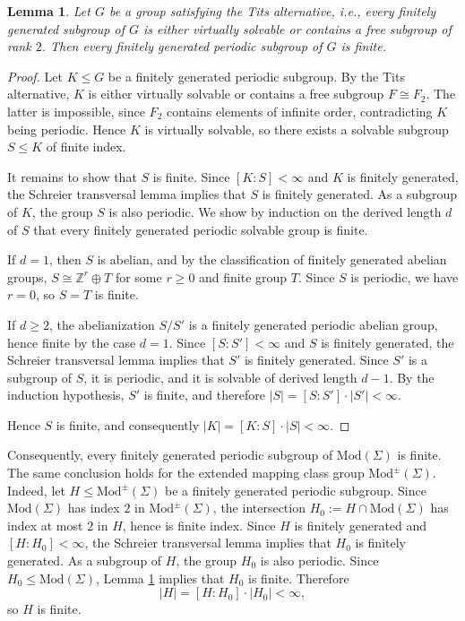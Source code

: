 \documentclass[12pt,a4paper]{amsart}
\numberwithin{equation}{section}
\theoremstyle{plain}
\newtheorem{lemma}[theorem]{Lemma}
\theoremstyle{definition}
\theoremstyle{remark}
\begin{document}
\begin{lemma} \label{lem:tits}
Let $G$ be a group satisfying the Tits alternative, i.e., every finitely generated subgroup of $G$ is either virtually solvable or contains a free subgroup of rank $2$. 
Then every finitely generated periodic subgroup of $G$ is finite.
\end{lemma}

\begin{proof}
Let $K \leq G$ be a finitely generated periodic subgroup.
By the Tits alternative, $K$ is either virtually solvable or contains a free subgroup $F \cong F_2$.
The latter is impossible, since $F_2$ contains elements of infinite order, contradicting $K$ being periodic.
Hence $K$ is virtually solvable, so there exists a solvable subgroup $S \leq K$ of finite index.

It remains to show that $S$ is finite.
Since $[K:S] < \infty$ and $K$ is finitely generated, the Schreier transversal lemma implies that $S$ is finitely generated.
As a subgroup of $K$, the group $S$ is also periodic.
We show by induction on the derived length $d$ of $S$ that every finitely generated periodic solvable group is finite.

If $d = 1$, then $S$ is abelian, and by the classification of finitely generated abelian groups, $S \cong \mathbb{Z}^r \oplus T$ for some $r \geq 0$ and finite group $T$.
Since $S$ is periodic, we have $r = 0$, so $S = T$ is finite.

If $d \geq 2$, the abelianization $S/S'$ is a finitely generated periodic abelian group, hence finite by the case $d=1$.
Since $[S:S'] < \infty$ and $S$ is finitely generated, the Schreier transversal lemma implies that $S'$ is finitely generated.
Since $S'$ is a subgroup of $S$, it is periodic, and it is solvable of derived length $d-1$.
By the induction hypothesis, $S'$ is finite, and therefore $|S| = [S:S'] \cdot |S'| < \infty$.

Hence $S$ is finite, and consequently $|K| = [K:S] \cdot |S| < \infty$.
\end{proof}

Consequently, every finitely generated periodic subgroup of $\mathrm{Mod}(\Sigma)$ is finite.
The same conclusion holds for the extended mapping class group $\mathrm{Mod}^{\pm}(\Sigma)$.
Indeed, let $H \leq \mathrm{Mod}^{\pm}(\Sigma)$ be a finitely generated periodic subgroup.
Since $\mathrm{Mod}(\Sigma)$ has index $2$ in $\mathrm{Mod}^{\pm}(\Sigma)$, the intersection $H_0 := H \cap \mathrm{Mod}(\Sigma)$ has index at most $2$ in $H$, hence is finite index.
Since $H$ is finitely generated and $[H : H_0] < \infty$, the Schreier transversal lemma implies that $H_0$ is 
finitely generated.
As a subgroup of $H$, the group $H_0$ is also periodic.
Since $H_0 \leq \mathrm{Mod}(\Sigma)$, Lemma \ref{lem:tits} implies that $H_0$ is finite. 
Therefore
\[
|H| = [H : H_0] \cdot |H_0| < \infty,
\]
so $H$ is finite.
\end{document}
